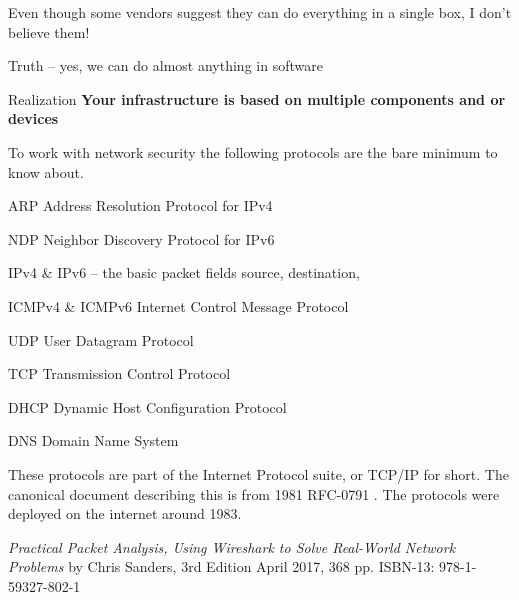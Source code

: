 \documentclass[Screen16to9,17pt]{foils}
\begin{document}


\begin{list2}
\item Even though some vendors suggest they can do everything in a single box, I don't believe them!
\item Truth -- yes, we can do almost anything in software
\item Realization {\bf Your infrastructure is based on multiple components and or devices}
\end{list2}



To work with network security the following protocols are the bare minimum to know about.

\begin{list2}
\item ARP Address Resolution Protocol for IPv4
\item NDP Neighbor Discovery Protocol for IPv6
\item IPv4 \& IPv6 -- the basic packet fields source, destination,
\item ICMPv4 \& ICMPv6 Internet Control Message Protocol
\item UDP User Datagram Protocol
\item TCP Transmission Control Protocol
\item DHCP Dynamic Host Configuration Protocol
\item DNS Domain Name System
\end{list2}

These protocols are part of the Internet Protocol suite, or TCP/IP for short. The canonical document describing this is from 1981 RFC-0791 . The protocols were deployed on the internet around 1983.




\emph{Practical Packet Analysis,
Using Wireshark to Solve Real-World Network Problems}
by Chris Sanders, 3rd Edition
April 2017, 368 pp.
ISBN-13:
978-1-59327-802-1

\end{document}
